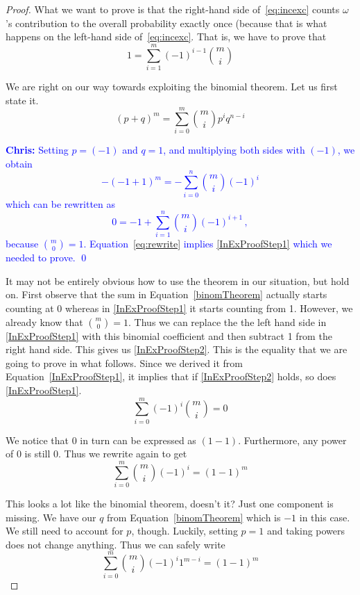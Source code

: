\documentclass[a4paper,11pt,leqno]{report}
\newcommand{\chris}[1]{ \textcolor{blue}{\textbf{Chris:} #1}}
\begin{document}
\begin{proof}
What we want to prove is that the right-hand side of~\eqref{eq:incexc} counts $ \omega $'s contribution to the overall probability exactly once (because that is what happens on the left-hand side of~\eqref{eq:incexc}.
That is, we have to prove that
\begin{equation} \label{InExProofStep1}
1 = \underset{i=1}{\overset{m}{\sum}}(-1)^{i-1}\binom{m}{i}
\end{equation}

We are right on our way towards exploiting the binomial theorem. Let us first state it.
\begin{equation} \label{binomTheorem}
(p + q)^{m} = \underset{i=0}{\overset{m}{\sum}} \binom{m}{i} p^{i}q^{n-i} 
\end{equation}

\chris{
Setting $p=(-1)$ and $q=1$, and multiplying both sides with $(-1)$, we obtain
\[
-(-1+1)^m = - \sum_{i=0}^n \binom{m}{i} (-1)^{i}
\]
which can be rewritten as
\begin{equation} \label{eq:rewrite}
0 = -1 + \sum_{i=1}^n \binom{m}{i} (-1)^{i+1} \, ,
\end{equation}
because $\binom{m}{0} = 1$. Equation~\eqref{eq:rewrite} implies \eqref{InExProofStep1} which we needed to prove.
\qed
}

It may not be entirely obvious how to use the theorem in our situation, but hold on. First observe
that the sum in Equation~\eqref{binomTheorem} actually starts counting at 0 whereas in \eqref{InExProofStep1}
it starts counting from 1. However, we already know that $ \binom{m}{0} = 1 $. Thus we can replace the
the left hand side in \eqref{InExProofStep1} with this binomial coefficient and then subtract 1 from the
right hand side. This gives us \ref{InExProofStep2}. This is the equality that we are going to prove
in what follows. Since we derived it from Equation~\eqref{InExProofStep1}, it implies that if \ref{InExProofStep2}
holds, so does \ref{InExProofStep1}.
\begin{equation} \label{InExProofStep2}
\underset{i=0}{\overset{m}{\sum}}(-1)^{i}\binom{m}{i} = 0
\end{equation} 

We notice that $ 0 $ in turn can be expressed as $ (1-1) $. Furthermore, any power of 0 is still 0.
Thus we rewrite again to get
\begin{equation}
\underset{i=0}{\overset{m}{\sum}}\binom{m}{i}(-1)^{i} = (1-1)^{m}
\end{equation}

This looks a lot like the binomial theorem, doesn't it? Just one component is missing. We have
our $ q $ from Equation~\eqref{binomTheorem} which is $ -1 $ in this case. We still need to account for 
$ p $, though. Luckily, setting $ p=1 $ and taking powers does not change anything. Thus we can safely write
\begin{equation}
\underset{i=0}{\overset{m}{\sum}}\binom{m}{i}(-1)^{i}1^{m-i} = (1-1)^{m}
\end{equation} 


\end{proof}
\end{document}
